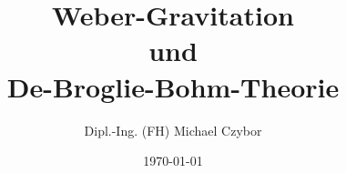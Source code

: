 \documentclass[11pt, a4paper, twoside, openright]{book}
\begin{document}
\frontmatter
\title{Weber-Gravitation\\und\\De-Broglie-Bohm-Theorie}
\author{Dipl.-Ing. (FH) Michael Czybor}
\date{\today}
\maketitle

\tableofcontents

\mainmatter



\backmatter
\printbibliography[title=Literaturverzeichnis]
\printglossary[title=Glossar]
\printglossary[type=acronym, title=Abkürzungen]
\end{document}
